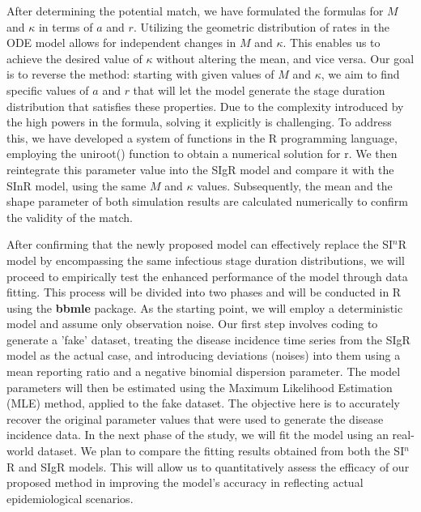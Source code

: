 \documentclass[12pt]{article}
\begin{document}
After determining the potential match, we have formulated the formulas for $M$ and $\kappa$ in terms of $a$ and $r$. Utilizing the geometric distribution of rates in the ODE model allows for independent changes in $M$ and $\kappa$. This enables us to achieve the desired value of $\kappa$ without altering the mean, and vice versa. Our goal is to reverse the method: starting with given values of $M$ and $\kappa$, we aim to find specific values of $a$ and $r$ that will let the model generate the stage duration distribution that satisfies these properties. Due to the complexity introduced by the high powers in the formula, solving it explicitly is challenging. To address this, we have developed a system of functions in the R programming language, employing the uniroot() function to obtain a numerical solution for r. We then reintegrate this parameter value into the SIgR model and compare it with the SInR model, using the same $M$ and $\kappa$ values. Subsequently, the mean and the shape parameter of both simulation results are calculated numerically to confirm the validity of the match.

After confirming that the newly proposed model can effectively replace the SI$^n$R model by encompassing the same infectious stage duration distributions, we will proceed to empirically test the enhanced performance of the model through data fitting. This process will be divided into two phases and will be conducted in R using the \textbf{bbmle} package. As the starting point, we will employ a deterministic model and assume only observation noise. Our first step involves coding to generate a 'fake' dataset, treating the disease incidence time series from the SIgR model as the actual case, and introducing deviations (noises) into them using a mean reporting ratio and a negative binomial dispersion parameter. The model parameters will then be estimated using the Maximum Likelihood Estimation (MLE) method, applied to the fake dataset. The objective here is to accurately recover the original parameter values that were used to generate the disease incidence data. In the next phase of the study, we will fit the model using an real-world dataset. We plan to compare the fitting results obtained from both the SI$^n$R and SIgR models. This will allow us to quantitatively assess the efficacy of our proposed method in improving the model's accuracy in reflecting actual epidemiological scenarios.
\end{document}
